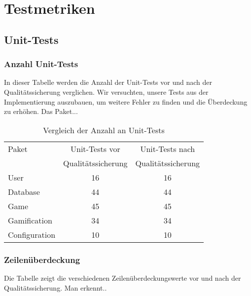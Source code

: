 \documentclass[a4paper]{scrreprt}
\begin{document}
    \chapter{Testmetriken}
    \section{Unit-Tests}

    \subsection{Anzahl Unit-Tests}
    In dieser Tabelle werden die Anzahl der Unit-Tests vor und nach der Qualitätssicherung verglichen. Wir versuchten, unsere Tests aus der Implementierung
    auszubauen, um weitere Fehler zu finden und die Überdeckung zu erhöhen. Das Paket...

    \vspace{20pt}
    \begin{table}[h]
        \begin{center}
        \begin{tabular}{ | l | c | c | }
            \hline
            Paket & Unit-Tests vor & Unit-Tests nach  \\
            & Qualitätssicherung & Qualitätssicherung \\ \hline
            User & 16 & 16 \\
            Database & 44 & 44 \\
            Game & 45 & 45 \\
            Gamification & 34 & 34 \\
            Configuration & 10 & 10 \\
            \hline
        \end{tabular}
        \end{center}
        \caption{Vergleich der Anzahl an Unit-Tests}
    \end{table}%

    \subsection{Zeilenüberdeckung}
    Die Tabelle zeigt die verschiedenen Zeilenüberdeckungswerte vor und nach der Qualitätssicherung. Man erkennt..
\end{document}
